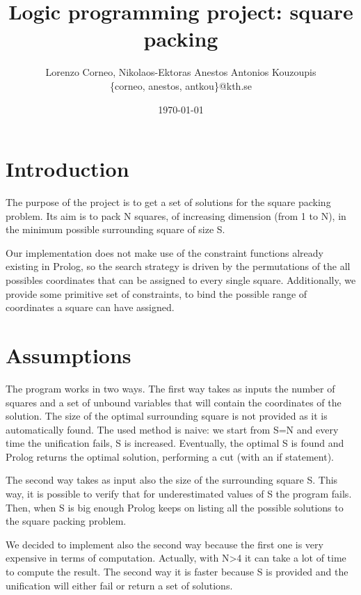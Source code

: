 \documentclass{article}
\begin{document}
\title{Logic programming project: square packing}
\author{Lorenzo Corneo, Nikolaos-Ektoras Anestos Antonios Kouzoupis \\
	\{corneo, anestos, antkou\}@kth.se}
\date{\today}
\maketitle

\section{Introduction}

The purpose of the project is to get a set of solutions for the square packing problem. Its aim is to pack N squares, of increasing dimension (from 1 to N), in the minimum possible surrounding square of size S.

Our implementation does not make use of the constraint functions already existing in Prolog, so the search strategy is driven by the permutations of the all possibles coordinates that can be assigned to every single square. Additionally, we provide some primitive set of constraints, to bind the possible range of coordinates a square can have assigned.

\section{Assumptions}

The program works in two ways. The first way takes as inputs the number of squares and a set of unbound variables that will contain the coordinates of the solution. The size of the optimal surrounding square is not provided as it is automatically found. The used method is naive: we start from S=N and every time the unification fails, S is increased. Eventually, the  optimal S is found and Prolog returns the optimal solution, performing a cut (with an if statement).

The second way takes as input also the size of the surrounding square S. This way, it is possible to verify that for underestimated values of S the program fails. Then, when S is big enough Prolog keeps on listing all the possible solutions to the square packing problem.

We decided to implement also the second way because the first one is very expensive in terms of computation. Actually, with N>4 it can take a lot of time to compute the result. The second way it is faster because S is provided and the unification will either fail or return a set of solutions.
\end{document}

